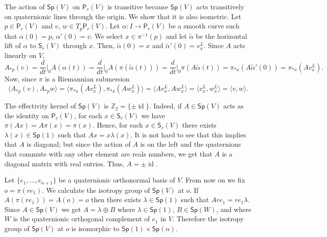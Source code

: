\documentclass[12pt, a4paper,draft]{amsart}
\newcommand{\id}{\operatorname{id}}
\newcommand{\Sp}{\mathsf{Sp}}
\theoremstyle{remark}
\begin{document}
The action of $\Sp(V)$ on $\mathsf{P}_r(V)$ is transitive because $\Sp(V)$ acts transitively on quaternionic lines through the origin.
We show that it is also isometric.
Let $p\in\mathsf{P}_r(V)$ and $v$, $w\in T_p\mathsf{P}_r(V)$.
Let $\alpha\colon I\to\mathsf{P}_r(V)$ be a smooth curve such that $\alpha(0)=p$, $\alpha'(0)=v$.
We select $x\in\pi^{-1}(p)$ and let $\tilde{\alpha}$ be the horizontal lift of $\alpha$ to $\mathsf{S}_r(V)$ through $x$.
Then, $\tilde{\alpha}(0)=x$ and $\tilde{\alpha}'(0)=v_x^L$.
Since $A$ acts linearly on $V$,
\[
A_{*p}(v)
=\frac{d}{dt}\Big\vert_0 A(\alpha(t))
=\frac{d}{dt}\Big\vert_0 A(\pi(\tilde{\alpha}(t)))
=\frac{d}{dt}\Big\vert_0 \pi(A\tilde{\alpha}(t))
=\pi_{*x}(A\tilde{\alpha}'(0))
=\pi_{*x}(Av_x^L).
\]
Now, since $\pi$ is a Riemannian submersion
\[
\langle A_{*p}(v),A_{*p}w\rangle
=\langle \pi_{*x}(A v_x^L),\pi_{*x}(A w_x^L)\rangle
=\langle A v_x^L,A w_x^L\rangle
=\langle v_x^L,w_x^L\rangle
=\langle v,w\rangle.
\]

The effectivity kernel of $\Sp(V)$ is $\mathbb{Z}_2=\{\pm \id\}$.
Indeed, if $A\in\Sp(V)$ acts as the identity on $\mathsf{P}_r(V)$, for each $x\in\mathsf{S}_r(V)$ we have 
$\pi(Ax)=A\pi(x)=\pi(x)$.
Hence, for each $x\in\mathsf{S}_r(V)$ there exists $\lambda(x)\in\Sp(1)$ such that $Ax=x\lambda(x)$.
It is not hard to see that this implies that $A$ is diagonal;
but since the action of $A$ is on the left and the quaternions that commute with any other element are reals numbers, we get that $A$ is a diagonal matrix with real entries.
Thus, $A=\pm\id$.

Let $\{e_1,\dots,e_{n+1}\}$ be a quaternionic orthonormal basis of $V$.
From now on we fix $o=\pi(r e_1)$.
We calculate the isotropy group of $\Sp(V)$ at $o$.
If $A(\pi(r e_1))=A(o)=o$ then there exists $\lambda\in\Sp(1)$ such that $Are_1=re_1\lambda$.
Since $A\in\Sp(V)$ we get $A=\lambda\oplus B$ where $\lambda\in\Sp(1)$, $B\in\Sp(W)$, and where $W$ is the quaternionic orthogonal complement of $e_1$ in $V$.
Therefore the isotropy group of $\Sp(V)$ at $o$ is isomorphic to $\Sp(1)\times\Sp(n)$.
\end{document}
